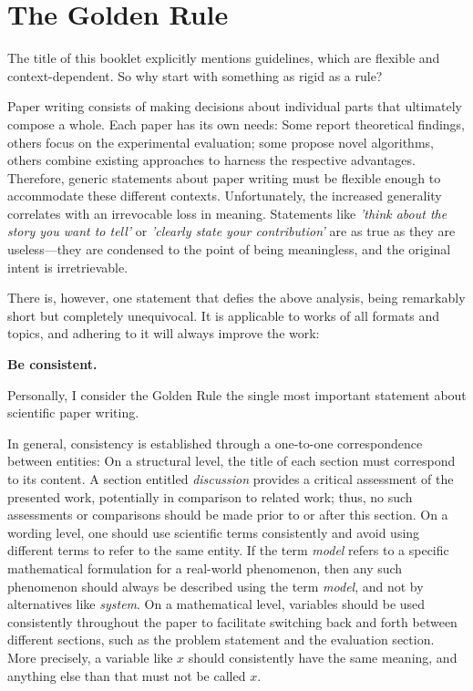 
\chapter*{The Golden Rule}
\label{ch:consistency}

The title of this booklet explicitly mentions guidelines, which are flexible and context-dependent.
So why start with something as rigid as a rule?

Paper writing consists of making decisions about individual parts that ultimately compose a whole.
Each paper has its own needs:
Some report theoretical findings, others focus on the experimental evaluation;
some propose novel algorithms, others combine existing approaches to harness the respective advantages.
Therefore, generic statements about paper writing must be flexible enough to accommodate these different contexts.
Unfortunately, the increased generality correlates with an irrevocable loss in meaning.
Statements like \emph{'think about the story you want to tell'} or \emph{'clearly state your contribution'} are as true as they are useless---they are condensed to the point of being meaningless, and the original intent is irretrievable.

There is, however, one statement that defies the above analysis, being remarkably short but completely unequivocal.
It is applicable to works of all formats and topics, and adhering to it will always improve the work:

\begin{tcolorbox}[
    title=The Golden Rule.,
    colback=color_guideline_background, colframe=color_guideline,
    sharp corners=northwest,bottomrule=0mm,rightrule=0mm,leftrule=0mm]
    \textbf{Be consistent.}
\end{tcolorbox}

\noindent Personally, I consider the Golden Rule the single most important statement about scientific paper writing.

In general, consistency is established through a one-to-one correspondence between entities:
On a structural level, the title of each section must correspond to its content.
A section entitled \emph{discussion} provides a critical assessment of the presented work, potentially in comparison to related work; thus, no such assessments or comparisons should be made prior to or after this section.
On a wording level, one should use scientific terms consistently and avoid using different terms to refer to the same entity.
If the term \emph{model} refers to a specific mathematical formulation for a real-world phenomenon, then any such phenomenon should always be described using the term \emph{model}, and not by alternatives like \emph{system}.
On a mathematical level, variables should be used consistently throughout the paper to facilitate switching back and forth between different sections, such as the problem statement and the evaluation section.
More precisely, a variable like $x$ should consistently have the same meaning, and anything else than that must not be called $x$.

